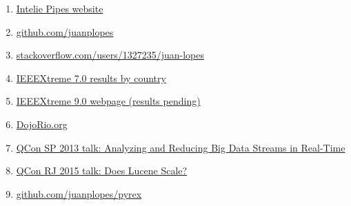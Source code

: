 \documentclass[a4paper,12pt,oneside]{article}
\begin{document}
\begin{enumerate}

  \item \label{url:pipes} \href{http://pipes.intelie.com}{Intelie Pipes website}

  \item \label{url:github} \href{https://github.com/juanplopes}{github.com/juanplopes}

  \item \label{url:stackoverflow} \href{http://stackoverflow.com/users/1327235/juan-lopes}{stackoverflow.com/users/1327235/juan-lopes}

  \item \label{url:ieeextreme7} \href{http://www.ieee.org/membership_services/membership/students/competitions/xtreme/xtreme7_final_rankings-country.pdf}{IEEEXtreme 7.0 results by country}
  
  \item \label{url:ieeextreme9} \href{http://www.ieee.org/xtreme}{IEEEXtreme 9.0 webpage (results pending)}
  
  \item \label{url:dojorio} \href{http://dojorio.org/}{DojoRio.org}
  
  \item \label{url:qconsp2013} \href{http://www.infoq.com/br/presentations/analisando-fluxo-dados-tempo-real}{QCon SP 2013 talk: Analyzing and Reducing Big Data Streams in Real-Time}

  \item \label{url:qconsp2015} \href{https://www.infoq.com/br/presentations/lucene-escala-full-text-para-big-data}{QCon RJ 2015 talk: Does Lucene Scale?}

  \item \label{url:pyrex} \href{http://github.com/juanplopes/pyrex}{github.com/juanplopes/pyrex}
  
  
\end{enumerate}
\end{document}

